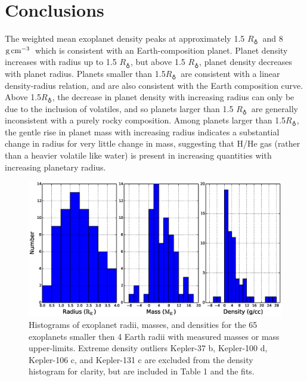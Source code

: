 \documentclass[iop]{emulateapj}
\newcommand{\gcmc}{\ensuremath{\rm g\,cm^{-3}}}
\newcommand{\gcc}{\gcmc}
\newcommand{\rearth}{\ensuremath{R_\earth}}
\begin{document}
\section{Conclusions}
The weighted mean exoplanet density peaks at approximately 1.5 \rearth\ and 8 \gcc\, which is consistent with an Earth-composition planet.  Planet density increases with radius up to 1.5 \rearth, but above 1.5 \rearth, planet density decreases with planet radius. Planets smaller than 1.5\rearth\ are consistent with a linear density-radius relation, and are also consistent with the \citet{Seager2007} Earth composition curve.  Above 1.5\rearth, the decrease in planet density with increasing radius can only be due to the inclusion of volatiles, and so planets larger than 1.5 \rearth\ are generally inconsistent with a purely rocky composition.  Among planets larger than 1.5\rearth, the gentle rise in planet mass with increasing radius indicates a substantial change in radius for very little change in mass, suggesting that H/He gas (rather than a heavier volatile like water) is present in increasing quantities with increasing planetary radius.





\begin{figure}[htbp] %
   \centering
   \includegraphics[width=7in]{histograms.eps} 
   \caption{\small Histograms of exoplanet radii, masses, and densities for the 65 exoplanets smaller then 4 Earth radii with measured masses or mass upper-limits.  Extreme density outliers Kepler-37 b, Kepler-100 d, Kepler-106 c, and Kepler-131 c are excluded from the density histogram for clarity, but are included in Table 1 and the fits.}
\label{fig:histograms}
\end{figure}
\end{document}

